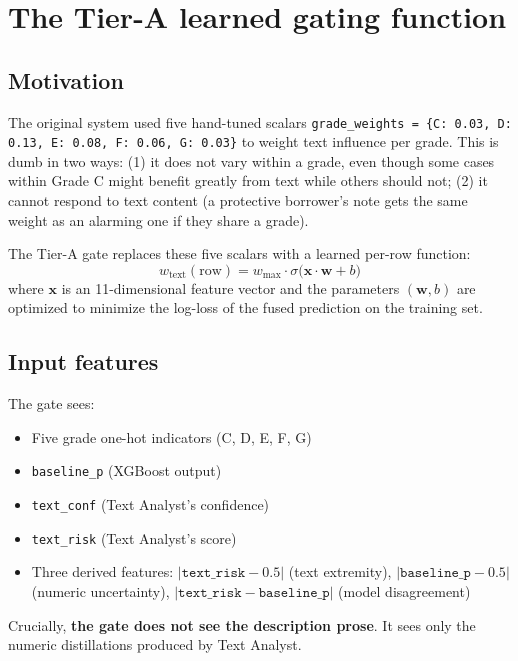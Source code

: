 \documentclass[11pt,a4paper]{article}
\begin{document}
\section{The Tier-A learned gating function}
\label{sec:gate}

\subsection{Motivation}

The original system used five hand-tuned scalars
\texttt{grade\_weights = \{C: 0.03, D: 0.13, E: 0.08, F: 0.06, G: 0.03\}}
to weight text influence per grade. This is dumb in two ways:
(1) it does not vary within a grade, even though some cases within Grade C
might benefit greatly from text while others should not; (2) it cannot
respond to text content (a protective borrower's note gets the same weight
as an alarming one if they share a grade).

The Tier-A gate replaces these five scalars with a learned per-row function:
\[
w_{\mathrm{text}}(\mathrm{row}) = w_{\max} \cdot \sigma\bigl(\mathbf{x} \cdot \mathbf{w} + b\bigr)
\]
where $\mathbf{x}$ is an 11-dimensional feature vector and the parameters
$(\mathbf{w}, b)$ are optimized to minimize the log-loss of the fused
prediction on the training set.

\subsection{Input features}

The gate sees:
\begin{itemize}[itemsep=0pt]
    \item Five grade one-hot indicators (C, D, E, F, G)
    \item \texttt{baseline\_p} (XGBoost output)
    \item \texttt{text\_conf} (Text Analyst's confidence)
    \item \texttt{text\_risk} (Text Analyst's score)
    \item Three derived features: $|\texttt{text\_risk} - 0.5|$ (text extremity),
          $|\texttt{baseline\_p} - 0.5|$ (numeric uncertainty),
          $|\texttt{text\_risk} - \texttt{baseline\_p}|$ (model disagreement)
\end{itemize}
\noindent
Crucially, \textbf{the gate does not see the description prose}. It sees only
the numeric distillations produced by Text Analyst.
\end{document}
